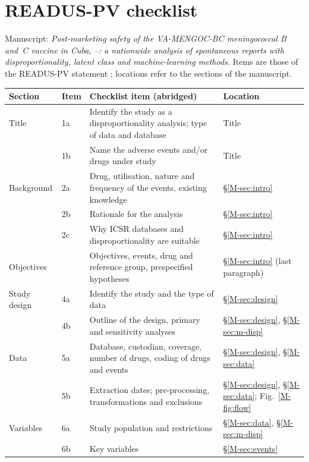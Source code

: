 \documentclass[10pt]{article}
\newcommand{\Loc}[1]{\S\ref{M-#1}}
\begin{document}
\SyntheticNotice
\section*{READUS-PV checklist}
\noindent Manuscript: \emph{Post-marketing safety of the VA-MENGOC-BC meningococcal B and~C vaccine in
Cuba, \VStudyFirstYear--\VStudyLastYear: a nationwide analysis of spontaneous reports with
disproportionality, latent class and machine-learning methods.} Items are those of the
READUS-PV statement \cite{Fusaroli2024Statement}; locations refer to the sections of the manuscript.

\small
\begin{longtable}{@{}>{\raggedright\arraybackslash}p{2.6cm}>{\raggedright\arraybackslash}p{0.8cm}>{\raggedright\arraybackslash}p{8.4cm}>{\raggedright\arraybackslash}p{3.4cm}@{}}
\toprule
Section & Item & Checklist item (abridged) & Location \\
\midrule
\endhead
\bottomrule
\endfoot
Title & 1a & Identify the study as a disproportionality analysis; type of data and database & Title \\
 & 1b & Name the adverse events and/or drugs under study & Title \\
Background & 2a & Drug, utilisation, nature and frequency of the events, existing knowledge & \Loc{sec:intro} \\
 & 2b & Rationale for the analysis & \Loc{sec:intro} \\
 & 2c & Why ICSR databases and disproportionality are suitable & \Loc{sec:intro} \\
Objectives & 3 & Objectives, events, drug and reference group, prespecified hypotheses & \Loc{sec:intro} (last paragraph) \\
Study design & 4a & Identify the study and the type of data & \Loc{sec:design} \\
 & 4b & Outline of the design, primary and sensitivity analyses & \Loc{sec:design}, \Loc{sec:m-disp} \\
Data & 5a & Database, custodian, coverage, number of drugs, coding of drugs and events & \Loc{sec:design}, \Loc{sec:data} \\
 & 5b & Extraction dates; pre-processing, transformations and exclusions & \Loc{sec:design}, \Loc{sec:data}; Fig.~\ref{M-fig:flow} \\
Variables & 6a & Study population and restrictions & \Loc{sec:data}, \Loc{sec:m-disp} \\
 & 6b & Key variables & \Loc{sec:events} \\

\end{longtable}
\end{document}
